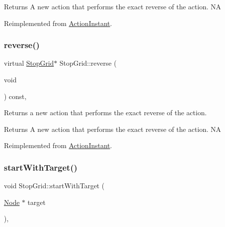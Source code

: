 \begin{DoxyReturn}{Returns}
A new action that performs the exact reverse of the action.  NA 
\end{DoxyReturn}


Reimplemented from \hyperlink{classActionInstant_aeb1870802c509e1f4111c863a28e9262}{Action\+Instant}.

\mbox{\label{classStopGrid_a8db549ab4f3da4564fadefb33f677517}} 
\subsubsection{\texorpdfstring{reverse()}{reverse()}\hspace{0.1cm}{\footnotesize\ttfamily [2/2]}}
{\footnotesize\ttfamily virtual \hyperlink{classStopGrid}{Stop\+Grid}$\ast$ Stop\+Grid\+::reverse (\begin{DoxyParamCaption}\item[{void}]{ }\end{DoxyParamCaption}) const\hspace{0.3cm}{\ttfamily [override]}, {\ttfamily [virtual]}}

Returns a new action that performs the exact reverse of the action.

\begin{DoxyReturn}{Returns}
A new action that performs the exact reverse of the action.  NA 
\end{DoxyReturn}


Reimplemented from \hyperlink{classActionInstant_aeb1870802c509e1f4111c863a28e9262}{Action\+Instant}.

\mbox{\label{classStopGrid_ac08e33d5e58962f6b9e1048c10c5ea44}} 
\subsubsection{\texorpdfstring{start\+With\+Target()}{startWithTarget()}\hspace{0.1cm}{\footnotesize\ttfamily [1/2]}}
{\footnotesize\ttfamily void Stop\+Grid\+::start\+With\+Target (\begin{DoxyParamCaption}\item[{\hyperlink{classNode}{Node} $\ast$}]{target }\end{DoxyParamCaption})\hspace{0.3cm}{\ttfamily [override]}, {\ttfamily [virtual]}}

